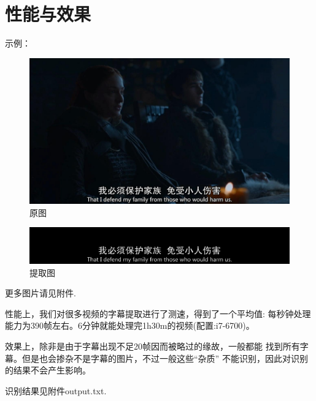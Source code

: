\documentclass{article}
\begin{document}
        \section{性能与效果}
            示例：
            \begin{figure}[!hbp]
                \centering
                \includegraphics[scale=0.3]{img_80420.jpg}
                \caption{原图}
            \end{figure}
            
            \begin{figure}[!hbp]
                \centering
                \includegraphics[scale=0.3]{604.png}
                \caption{提取图}
            \end{figure}
            
            更多图片请见附件.

            性能上，我们对很多视频的字幕提取进行了测速，得到了一个平均值:
            每秒钟处理能力为390帧左右。6分钟就能处理完1h30m的视频(配置:i7-6700)。

            效果上，除非是由于字幕出现不足20帧因而被略过的缘故，一般都能
            找到所有字幕。但是也会掺杂不是字幕的图片，不过一般这些“杂质”
            不能识别，因此对识别的结果不会产生影响。

            识别结果见附件output.txt.
    
\end{document}
